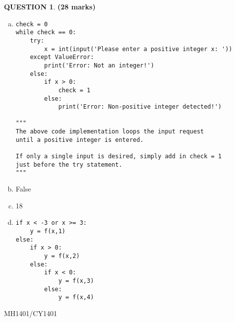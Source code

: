 \documentclass[a4paper,12pt]{article}
\theoremstyle{definition}
\newtheorem{ques}[dummy]{QUESTION}
\theoremstyle{plain}
\newcommand{\py}{python}
\begin{document}
	\begin{ques}\hfill\textbf{(28 marks)}\\
		\begin{enumerate}[(a)]
			\item 
			\begin{verbatim}
check = 0
while check == 0:
    try:
        x = int(input('Please enter a positive integer x: '))
    except ValueError:
        print('Error: Not an integer!')
    else:
        if x > 0:
            check = 1
        else:
            print('Error: Non-positive integer detected!')
			
"""
The above code implementation loops the input request
until a positive integer is entered.

If only a single input is desired, simply add in check = 1
just before the try statement.
"""
			\end{verbatim}
			\item False
			\item 18
			\item 
			\begin{verbatim}
if x < -3 or x >= 3:
    y = f(x,1)
else:
    if x > 0:
        y = f(x,2)
    else:
        if x < 0:
            y = f(x,3)
        else:
            y = f(x,4)
			\end{verbatim}
		\end{enumerate}
	\end{ques}
	
	\newpage
	\hfill MH1401/CY1401\vspace*{0.5em}
	
\end{document}

